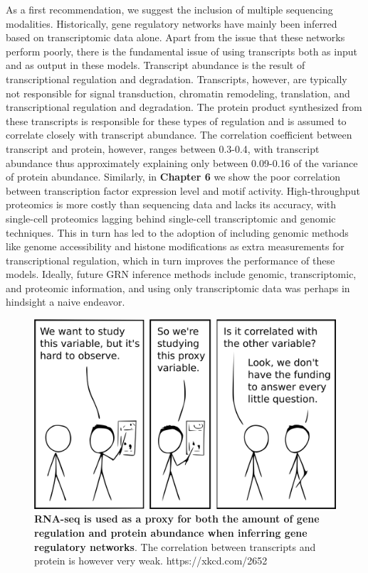As a first recommendation, we suggest the inclusion of multiple sequencing modalities. Historically, gene regulatory networks have mainly been inferred based on transcriptomic data alone. Apart from the issue that these networks perform poorly\cite{McCalla_2021,Chen_2018,Pratapa_2020}, there is the fundamental issue of using transcripts both as input and as output in these models. Transcript abundance is the result of transcriptional regulation and degradation. Transcripts, however, are typically not responsible for signal transduction, chromatin remodeling, translation, and transcriptional regulation and degradation. The protein product synthesized from these transcripts is responsible for these types of regulation and is assumed to correlate closely with transcript abundance. The correlation coefficient between transcript and protein, however, ranges between 0.3-0.4\cite{Fortelny2017,Franks2017}, with transcript abundance thus approximately explaining only between 0.09-0.16 of the variance of protein abundance. Similarly, in \textbf{Chapter 6} we show the poor correlation between transcription factor expression level and motif activity. High-throughput proteomics is more costly than sequencing data and lacks its accuracy, with single-cell proteomics lagging behind single-cell transcriptomic and genomic techniques\cite{Bennett2023}. This in turn has led to the adoption of including genomic methods like genome accessibility and histone modifications as extra measurements for transcriptional regulation\cite{Xu_2020,Kamal_2021,Aibar_2017}, which in turn improves the performance of these models. Ideally, future GRN inference methods include genomic, transcriptomic, and proteomic information, and using only transcriptomic data was perhaps in hindsight a naive endeavor.

\begin{figure}[H]
    \centering
    \includegraphics[width=0.7\linewidth]{ch.discussion/imgs/xkcd_proxy.png}
    \caption{\textbf{RNA-seq is used as a proxy for both the amount of gene regulation and protein abundance when inferring gene regulatory networks}. The correlation between transcripts and protein is however very weak. https://xkcd.com/2652}
    \label{fig:xkcd_proxy}
\end{figure}

